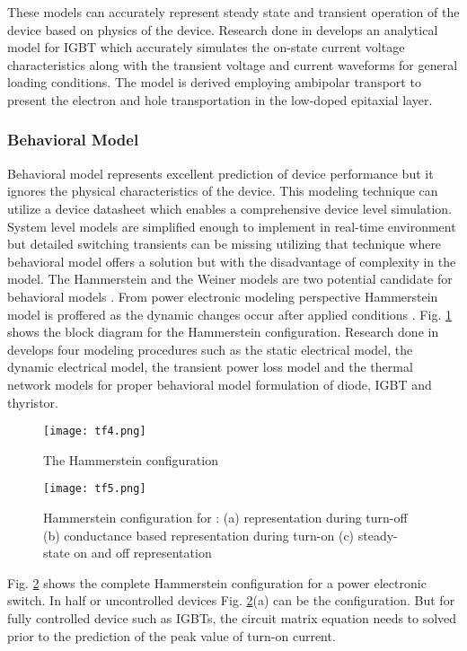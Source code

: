 \documentclass[journal]{IEEEtran}
\begin{document}
These models can accurately represent steady state and transient operation of the device based on physics of the device. Research done in \cite{hefner1990analytical} develops an analytical model for IGBT which accurately simulates the on-state current voltage characteristics along with the transient voltage and current waveforms for general loading conditions. The model is derived employing ambipolar transport to present the electron and hole transportation in the low-doped epitaxial layer.


\subsubsection{Behavioral Model}
Behavioral model represents excellent prediction of device performance but it ignores the physical characteristics of the device. This modeling technique can utilize a device datasheet which enables a comprehensive device level simulation. System level models are simplified enough to implement in real-time environment but detailed switching transients can be missing utilizing that technique where behavioral model offers a solution but with the disadvantage of complexity in the model. The Hammerstein and the Weiner models are two potential candidate for behavioral models \cite{liang2017real}. From power electronic modeling perspective Hammerstein model is proffered as the dynamic changes occur after applied conditions \cite{liang2017real}. Fig. \ref{fig:T4} shows the block diagram for the Hammerstein configuration. Research done in  \cite{liang2017real} develops four modeling procedures such as the static electrical model, the dynamic electrical model, the transient power loss model and the thermal network models for proper behavioral model formulation of diode, IGBT and thyristor. 


\begin{figure}[ht]
    \centering
    \texttt{[image: tf4.png]}
    \caption{The Hammerstein configuration \cite{liang2017real} }
    \label{fig:T4}
\end{figure}

\begin{figure}[ht]
    \centering
    \texttt{[image: tf5.png]}
    \caption{Hammerstein configuration for : (a) representation during turn-off (b) conductance based representation during turn-on (c) steady-state on and off representation \cite{liang2017real} }
    \label{fig:T5}
\end{figure}

Fig. \ref{fig:T5} shows the complete Hammerstein configuration for a power electronic switch. In half or uncontrolled devices Fig. \ref{fig:T5}(a) can be the configuration. But for fully controlled device such as IGBTs, the circuit matrix equation needs to solved prior to the prediction of the peak value of turn-on current.
\end{document}
